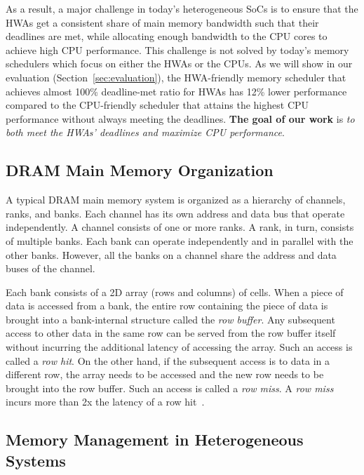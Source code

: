 \documentclass[10pt,letterpaper]{article}
\begin{document}
As a result, a major challenge in today's heterogeneous SoCs is to ensure that
the HWAs get a consistent share of main memory bandwidth such that their
deadlines are met, while allocating enough bandwidth to the CPU cores to
achieve high CPU performance. This challenge is not solved by today's memory
schedulers which focus on either the HWAs or the CPUs.
As we will show in our evaluation (Section~\ref{sec:evaluation}), the HWA-friendly memory
scheduler that achieves almost 100\% deadline-met ratio for HWAs has 12\% lower
performance compared to the CPU-friendly scheduler that attains the highest CPU
performance without always meeting the deadlines. \textbf{The goal of our work} is \emph{to
both meet the HWAs' deadlines and maximize CPU performance}.

\subsection{DRAM Main Memory Organization}



A typical DRAM main memory system is organized as a hierarchy of channels,
ranks, and banks. Each channel has its own address and data bus that operate
independently. A channel consists of one or more ranks. A rank, in turn,
consists of multiple banks. Each bank can operate independently and in parallel
with the other banks. However, all the banks on a channel share the address
and data buses of the channel.

Each bank consists of a 2D array (rows and columns) of cells.
When a piece of data is accessed from a bank, the
entire row containing the piece of data is brought into a bank-internal
structure called the \emph{row buffer}. Any subsequent access to other data in
the same row can be served from the row buffer itself without incurring the
additional latency of accessing the array. Such an access is called a \emph{row
hit}. On the other hand, if the subsequent access is to data in a different
row, the array needs to be accessed and the new row needs to be brought into the
row buffer. Such an access is called a \emph{row miss}. A \emph{row miss} incurs
more than 2x the latency of a row hit~\cite{parbs,frfcfs}.








\subsection{Memory Management in Heterogeneous Systems}
\end{document}
